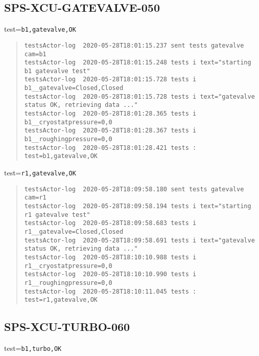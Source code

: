 \subsection{SPS-XCU-GATEVALVE-050}
\label{sec:tc-050}

test=\texttt{b1,gatevalve,OK}

\begin{quote}
\begin{tiny}
\begin{verbatim}
testsActor-log  2020-05-28T18:01:15.237 sent tests gatevalve cam=b1
testsActor-log  2020-05-28T18:01:15.248 tests i text="starting b1 gatevalve test"
testsActor-log  2020-05-28T18:01:15.728 tests i b1__gatevalve=Closed,Closed
testsActor-log  2020-05-28T18:01:15.728 tests i text="gatevalve status OK, retrieving data ..."
testsActor-log  2020-05-28T18:01:28.365 tests i b1__cryostatpressure=0,0
testsActor-log  2020-05-28T18:01:28.367 tests i b1__roughingpressure=0,0
testsActor-log  2020-05-28T18:01:28.421 tests : test=b1,gatevalve,OK
\end{verbatim}
\end{tiny}
\end{quote}

\noindent test=\texttt{r1,gatevalve,OK}

\begin{quote}
\begin{tiny}
\begin{verbatim}
testsActor-log  2020-05-28T18:09:58.180 sent tests gatevalve cam=r1
testsActor-log  2020-05-28T18:09:58.194 tests i text="starting r1 gatevalve test"
testsActor-log  2020-05-28T18:09:58.683 tests i r1__gatevalve=Closed,Closed
testsActor-log  2020-05-28T18:09:58.691 tests i text="gatevalve status OK, retrieving data ..."
testsActor-log  2020-05-28T18:10:10.988 tests i r1__cryostatpressure=0,0
testsActor-log  2020-05-28T18:10:10.990 tests i r1__roughingpressure=0,0
testsActor-log  2020-05-28T18:10:11.045 tests : test=r1,gatevalve,OK
\end{verbatim}
\end{tiny}
\end{quote}


\subsection{SPS-XCU-TURBO-060}
\label{sec:tc-060}

test=\texttt{b1,turbo,OK}

